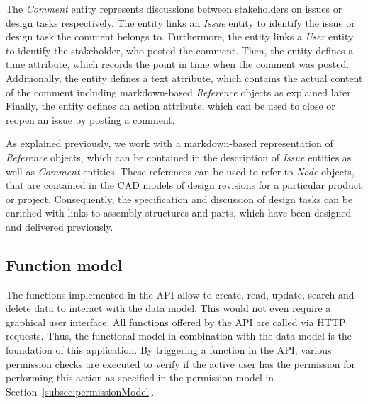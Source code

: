    The \textit{Comment} entity represents discussions between stakeholders on issues or design tasks respectively.
    The entity links an \textit{Issue} entity to identify the issue or design task the comment belongs to.
    Furthermore, the entity links a \textit{User} entity to identify the stakeholder, who posted the comment.
    Then, the entity defines a time attribute, which records the point in time when the comment was posted.
    Additionally, the entity defines a text attribute, which contains the actual content of the comment including markdown-based \textit{Reference} objects as explained later.
    Finally, the entity defines an action attribute, which can be used to close or reopen an issue by posting a comment.

    As explained previously, we work with a markdown-based representation of \textit{Reference} objects, which can be contained in the description of \textit{Issue} entities as well as \textit{Comment} entities.
    These references can be used to refer to \textit{Node} objects, that are contained in the CAD models of design revisions for a particular product or project.
    Consequently, the specification and discussion of design tasks can be enriched with links to assembly structures and parts, which have been designed and delivered previously.

    \subsection*{Function model} 
    The functions implemented in the API allow to create, read, update, search and delete data to interact with the data model. This would not even require a graphical user interface. All functions offered by the API are called via HTTP requests. Thus, the functional model in combination with the data model is the foundation of this application. 
    By triggering a function in the API, various permission checks are executed to verify if the active user has the permission for performing this action as specified in the permission model in Section~\ref{subsec:permissionModel}. 

